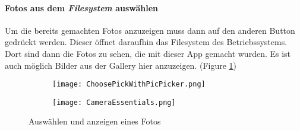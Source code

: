 \paragraph{Fotos aus dem \textit{Filesystem} auswählen}
 Um die bereits gemachten Fotos anzuzeigen muss dann auf den anderen Button gedrückt werden.
 Dieser öffnet daraufhin das Filesystem des Betriebssystems. Dort sind dann die Fotos zu sehen, die mit dieser App gemacht wurden.
 Es ist auch möglich Bilder aus der Gallery hier anzuzeigen. (Figure \ref{fig:TakePicFromPicker})

 \begin{figure}[hbt!]
    \centering
    \begin{subfigure}[b]{0.4\linewidth}
        \texttt{[image: ChoosePickWithPicPicker.png]}
      \end{subfigure}
      \begin{subfigure}[b]{0.4\linewidth}
        \texttt{[image: CameraEssentials.png]}
      \end{subfigure}
    \caption{Auswählen und anzeigen eines Fotos}
    \label{fig:TakePicFromPicker}
\end{figure}
